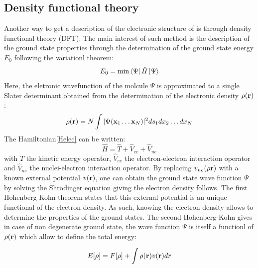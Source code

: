 \documentclass[10pt]{report}
\numberwithin{equation}{section}
\begin{document}
\subsection{Density functional theory}

Another way to get a description of the electronic structure of is through density functional theory (DFT).
The main interest of such method is the description of the ground state properties through the determination of the ground state energy $E_0$ following the variationl theorem:
\begin{equation}
    E_0 = \min \bra{\Psi} \hat{H} \ket{\Psi}
\end{equation}
Here, the eletronic wavefunction of the molcule $\Psi$ is approximated to a single Slater determinant obtained from the determination of the electronic density $\rho(\vb r)$:
\begin{equation}
    \rho(\vb r)=N\int |\Psi(\vb x_1 \ldots \vb x_N)|^2 ds_1 dx_2 \ldots dx_N
\end{equation}
The Hamiltonian\ref{Helec} can be written:
\begin{equation}\label{Hop}
    \hat{H}=\hat{T} + \hat{V}_{ee} + \hat{V}_{ne}
\end{equation} 
with $\hat{T}$ the kinetic energy operator, $\hat{V}_{ee}$ the electron-electron interaction operator and $\hat{V}_{ne}$ the nuclei-electron interaction operator. 
By replacing $v_{ne}(\rho\vb r)$ with a known external potential $v(\vb r)$, one can obtain the ground state wave function $\Psi$ by solving the Shrodinger equation giving the electron density follows.
The first Hohenberg-Kohn theorem states that this external potential is an unique functional of the electron density.
As such, knowing the electron density allows to determine the properties of the ground states.
The second Hohenberg-Kohn gives in case of non degenerate ground state, the wave function $\Psi$ is itself a functionl of $\rho(\vb r)$ which allow to define the total energy:

\begin{equation}\label{EnergyDFT}
    E[\rho]= F[\rho]+ \int \rho(\vb r) v(\vb r)dr
\end{equation}
\end{document}
